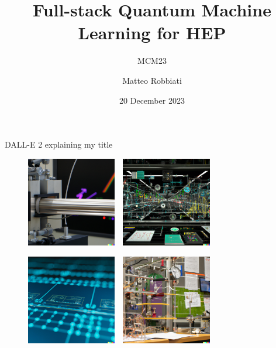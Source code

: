 \documentclass[8pt, xcolor={svgnames}, hyperref={linkcolor=black}]{beamer}
\title{Full-stack Quantum Machine Learning for HEP}
\subtitle{MCM23}
\date{20 December 2023}
\author[Matteo Robbiati]{Matteo Robbiati}
\begin{document}
\maketitle

\begin{frame}{DALL-E 2 explaining my title}
\begin{figure}  
    \includegraphics[width=0.35\textwidth]{figures/dalle1.png}%
    \,\,
    \includegraphics[width=0.35\textwidth]{figures/dalle2.png}

    \includegraphics[width=0.35\textwidth]{figures/dalle3.png}%
    \,\,
    \includegraphics[width=0.35\textwidth]{figures/dalle4.png}
\end{figure}
\end{frame}
\end{document}
